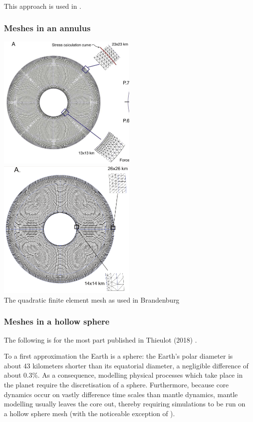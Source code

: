 This approach is used in .

\subsubsection{Meshes in an annulus}


\begin{center}
\includegraphics[width=6.8cm]{images/meshes/brhv08}
\includegraphics[width=6.8cm]{images/meshes/brva07a}\\
{\captionfont The quadratic finite element mesh as used in 
Brandenburg \etal \cite{brhv08,brva07a}}
\end{center}


\subsubsection{Meshes in a hollow sphere}

The following is for the most part published in Thieulot (2018) \cite{thie18}.

To a first approximation the Earth is a sphere: the Earth's polar diameter is 
about 43 kilometers shorter than its equatorial diameter, a negligible difference of 
about 0.3\%. As a consequence, modelling physical processes 
which take place in the planet require the discretisation of a sphere. 
Furthermore, because core dynamics occur on vastly difference time scales than mantle dynamics, mantle 
modelling usually leaves the core out, thereby requiring simulations to be run on a hollow sphere mesh
(with the noticeable exception of \cite{geyu07}).


